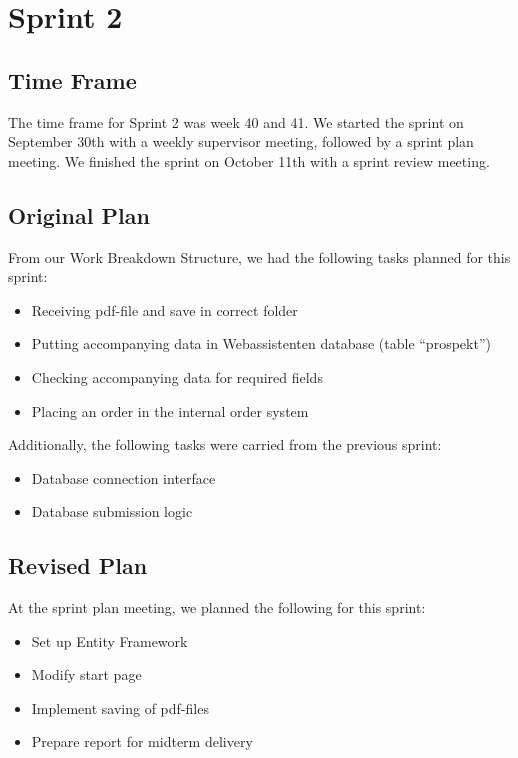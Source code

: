\section{Sprint 2}

\subsection{Time Frame}
The time frame for Sprint 2 was week 40 and 41. We started the sprint on September 30th with a weekly supervisor meeting, followed by a sprint plan meeting. We finished the sprint on October 11th with a sprint review meeting.

\subsection{Original Plan}
From our Work Breakdown Structure, we had the following tasks planned for this sprint:
\begin{itemize}
	\item Receiving pdf-file and save in correct folder
	\item Putting accompanying data in Webassistenten database (table “prospekt”)
	\item Checking accompanying data for required fields
	\item Placing an order in the internal order system
\end{itemize}

Additionally, the following tasks were carried from the previous sprint:
\begin{itemize}
	\item Database connection interface
	\item Database submission logic
\end{itemize}

\subsection{Revised Plan}
At the sprint plan meeting, we planned the following for this sprint:
\begin{itemize}
	\item Set up Entity Framework
	\item Modify start page
	\item Implement saving of pdf-files
	\item Prepare report for midterm delivery
\end{itemize}

